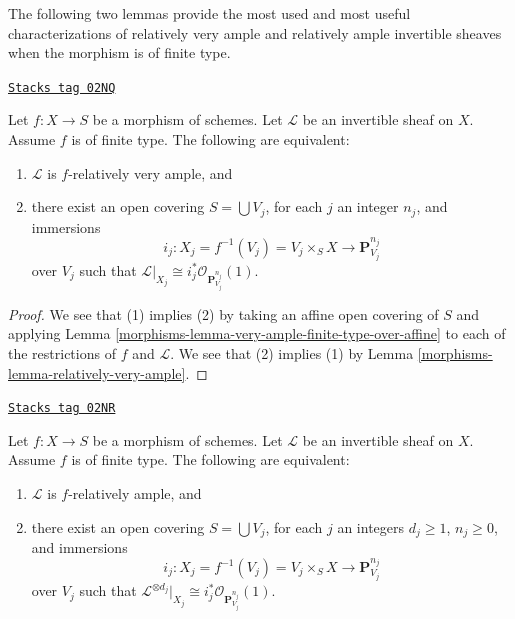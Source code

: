 The following two lemmas provide the most used and most useful
characterizations of relatively very ample and relatively ample
invertible sheaves when the morphism is of finite type.

\begin{lemma}
\label{morphisms-lemma-characterize-very-ample-on-finite-type}
\href{https://stacks.math.columbia.edu/tag/02NQ}{\texttt{Stacks tag 02NQ}}

Let $f : X \to S$ be a morphism of schemes.
Let $\mathcal{L}$ be an invertible sheaf on $X$.
Assume $f$ is of finite type.
The following are equivalent:
\begin{enumerate}
\item $\mathcal{L}$ is $f$-relatively very ample, and
\item there exist an open covering $S = \bigcup V_j$,
for each $j$ an integer $n_j$, and immersions
$$
i_j :
X_j = f^{-1}(V_j) = V_j \times_S X
\longrightarrow
\mathbf{P}^{n_j}_{V_j}
$$
over $V_j$ such that
$\mathcal{L}|_{X_j} \cong i_j^*\mathcal{O}_{\mathbf{P}^{n_j}_{V_j}}(1)$.
\end{enumerate}
\end{lemma}

\begin{proof}

We see that (1) implies (2) by taking an affine open covering of $S$
and applying Lemma \ref{morphisms-lemma-very-ample-finite-type-over-affine} to
each of the restrictions of $f$ and
$\mathcal{L}$. We see that (2) implies (1) by
Lemma \ref{morphisms-lemma-relatively-very-ample}.
\end{proof}

\begin{lemma}
\label{morphisms-lemma-characterize-ample-on-finite-type}
\href{https://stacks.math.columbia.edu/tag/02NR}{\texttt{Stacks tag 02NR}}

Let $f : X \to S$ be a morphism of schemes.
Let $\mathcal{L}$ be an invertible sheaf on $X$.
Assume $f$ is of finite type.
The following are equivalent:
\begin{enumerate}
\item $\mathcal{L}$ is $f$-relatively ample, and
\item there exist an open covering $S = \bigcup V_j$,
for each $j$ an integers $d_j \geq 1$,
$n_j \geq 0$, and immersions
$$
i_j :
X_j = f^{-1}(V_j) = V_j \times_S X
\longrightarrow
\mathbf{P}^{n_j}_{V_j}
$$
over $V_j$ such that
$\mathcal{L}^{\otimes d_j}|_{X_j} \cong
i_j^*\mathcal{O}_{\mathbf{P}^{n_j}_{V_j}}(1)$.
\end{enumerate}
\end{lemma}

